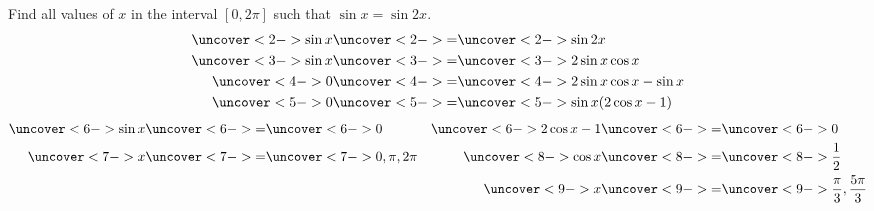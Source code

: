\begin{frame}
\begin{example}
Find all values of $x$ in the interval $[0, 2\pi ]$ such that $\sin x = \sin 2x$.
\abovedisplayskip=0pt
\belowdisplayskip=0pt
\abovedisplayshortskip=0pt
\belowdisplayshortskip=0pt
\begin{align*}
\uncover<2->{\sin x} & \uncover<2->{=}  \uncover<2->{\sin 2x}\\
\uncover<3->{\sin x} & \uncover<3->{=}  \uncover<3->{2\sin x \cos x}\\
\uncover<4->{0} & \uncover<4->{=}  \uncover<4->{2\sin x \cos x - \sin x}\\
\uncover<5->{0} & \uncover<5->{=}  \uncover<5->{\sin x (2 \cos x - 1)}
\end{align*}
\abovedisplayskip=0pt
\belowdisplayskip=0pt
\abovedisplayshortskip=0pt
\belowdisplayshortskip=0pt
\begin{align*}
\uncover<6->{\sin x} & \uncover<6->{=}  \uncover<6->{0} & \uncover<6->{ 2\cos x - 1} & \uncover<6->{=}  \uncover<6->{0}\\
\uncover<7->{ x} & \uncover<7->{=}  \uncover<7->{0, \pi , 2\pi} & \uncover<8->{\cos x} & \uncover<8->{=}  \uncover<8->{\frac{1}{2}}\\
& & \uncover<9->{ x} & \uncover<9->{=}  \uncover<9->{\frac{\pi}{3}, \frac{5\pi}{3}}
\end{align*}
\end{example}
\end{frame}
